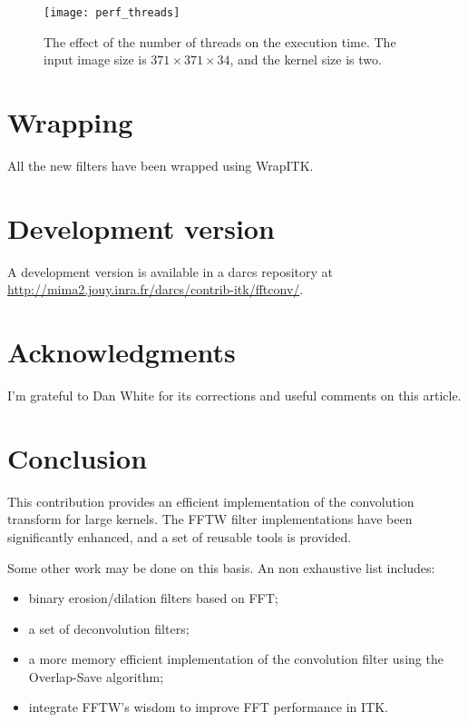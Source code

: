 \documentclass{InsightArticle}
\begin{document}
\begin{figure}[htbp]
\centering
\texttt{[image: perf\_threads]}
\caption{The effect of the number of threads on the execution time. The input image size is
$371 \times 371 \times 34$, and the kernel size is two.
\label{fig:perf-kernel}}
\end{figure}

\section{Wrapping}

All the new filters have been wrapped using WrapITK.

\section{Development version}

A development version is available in a darcs repository at
\url{http://mima2.jouy.inra.fr/darcs/contrib-itk/fftconv/}.

\section{Acknowledgments}

I'm grateful to Dan White for its corrections and useful comments on this article.

\section{Conclusion}

This contribution provides an efficient implementation of the convolution transform for large kernels.
The FFTW filter implementations have been significantly enhanced, and a set of reusable tools is provided.

Some other work may be done on this basis. An non exhaustive list includes:
\begin{itemize}
 \item binary erosion/dilation filters based on FFT;
 \item a set of deconvolution filters;
 \item a more memory efficient implementation of the convolution filter using the Overlap-Save algorithm;
 \item integrate FFTW's wisdom to improve FFT performance in ITK.
\end{itemize}


\appendix





\nocite{ITKSoftwareGuide}
\end{document}
